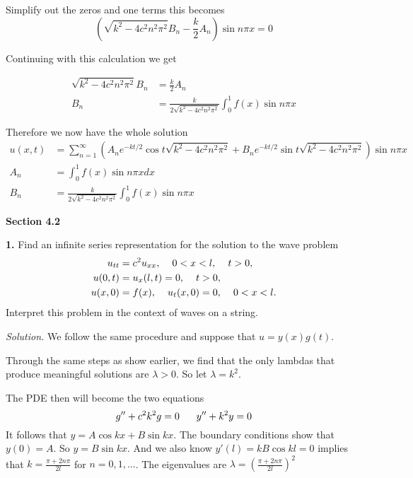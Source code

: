 \documentclass{article}
\begin{document}
Simplify out the zeros and one terms this becomes
\[
( \sqrt{k^2 - 4c^2n^2\pi^2} B_n - \frac k2 A_n )\sin n\pi x = 0 
\]

\newpage 
Continuing with this calculation we get 


\begin{align*}
\sqrt{k^2 - 4c^2n^2\pi^2} B_n  &= \frac k2 A_n\\
B_n &= \frac{k}{2\sqrt{k^2 - 4c^2n^2\pi^2}} \int_0^1 f(x) \sin n\pi x
\end{align*}

Therefore we now have the whole solution
\begin{align*}
u(x,t) &=  \sum_{n=1}^\infty (A_n e^{-kt/2}\cos t\sqrt{k^2 - 4c^2n^2\pi^2}  + B_ne^{-kt/2} \sin  t\sqrt{k^2 - 4c^2n^2\pi^2} ) \sin n\pi x \\
A_n &= \int_0^1 f(x) \sin n\pi x dx \\
B_n &= \frac{k}{2\sqrt{k^2 - 4c^2n^2\pi^2}} \int_0^1 f(x) \sin n\pi x
\end{align*}







\newpage
\textbf{Section 4.2}


\textbf{1. } Find an infinite series representation for the solution to the wave problem
\begin{align*}
u_{tt} &= c^2u_{xx},\hspace{4mm}0<x<l,\hspace{4mm}t>0,\\
u(0,t) &= u_x(l,t) = 0, \hspace{4mm}t>0,\\
u(x,0)&=f(x), \hspace{4mm} u_t(x,0)=0,\hspace{4mm} 0<x<l. 
\end{align*}
Interpret this problem in the context of waves on a string. 




\vspace{3mm}
\textit{Solution.}  We follow the same procedure and suppose that \(u=y(x)g(t)\). 

Through the same steps as show earlier, we find that the only lambdas that produce meaningful solutions are \(\lambda >0\). So let \( \lambda = k^2\). 

The PDE then will become the two equations 
\[
g'' + c^2k^2g=0  \hspace{6mm} y''+k^2 y = 0 
\]
It follows that \(y= A\cos kx + B\sin kx\). The boundary conditions show that \(y(0)=A\). So \(y=B\sin kx\). 
And we also know \(y'(l) = kB \cos kl = 0\) implies that \( k= \frac{\pi + 2n\pi}{2l} \) for \( n=0,1,...\). The eigenvalues are \(\lambda=  (  \frac{\pi + 2n\pi}{2l} )^2 \) 
\end{document}
